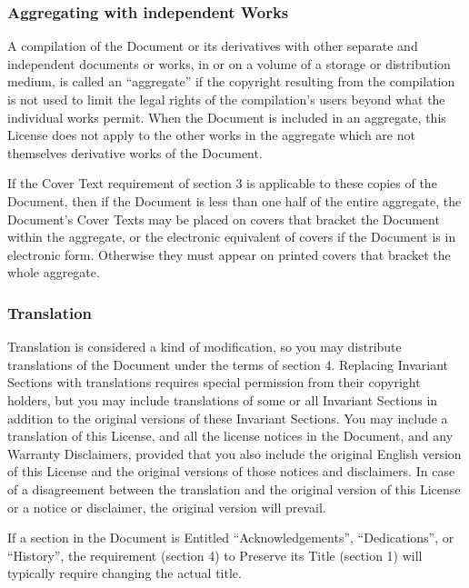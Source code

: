 \subsubsection{Aggregating with independent Works}

A compilation of the Document or its derivatives with other separate
and independent documents or works, in or on a volume of a storage or
distribution medium, is called an ``aggregate'' if the copyright
resulting from the compilation is not used to limit the legal rights
of the compilation's users beyond what the individual works permit.
When the Document is included in an aggregate, this License does not
apply to the other works in the aggregate which are not themselves
derivative works of the Document.

If the Cover Text requirement of section 3 is applicable to these
copies of the Document, then if the Document is less than one half of
the entire aggregate, the Document's Cover Texts may be placed on
covers that bracket the Document within the aggregate, or the
electronic equivalent of covers if the Document is in electronic form.
Otherwise they must appear on printed covers that bracket the whole
aggregate.



\subsubsection{Translation}

Translation is considered a kind of modification, so you may
distribute translations of the Document under the terms of section 4.
Replacing Invariant Sections with translations requires special
permission from their copyright holders, but you may include
translations of some or all Invariant Sections in addition to the
original versions of these Invariant Sections.  You may include a
translation of this License, and all the license notices in the
Document, and any Warranty Disclaimers, provided that you also include
the original English version of this License and the original versions
of those notices and disclaimers.  In case of a disagreement between
the translation and the original version of this License or a notice
or disclaimer, the original version will prevail.

If a section in the Document is Entitled ``Acknowledgements'',
``Dedications'', or ``History'', the requirement (section 4) to Preserve
its Title (section 1) will typically require changing the actual
title.


